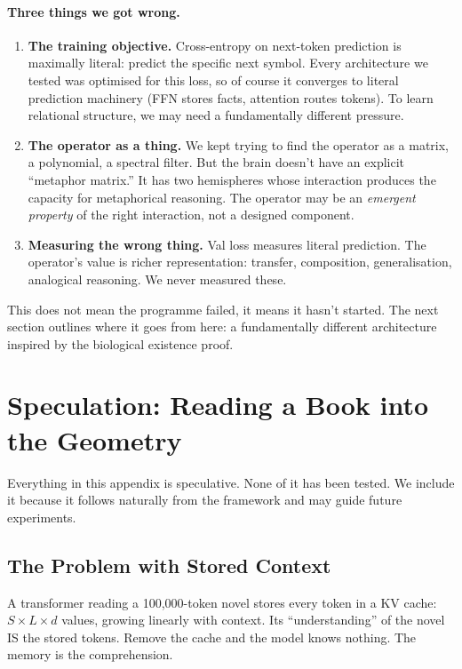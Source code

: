 \documentclass[11pt, a4paper]{article}
\theoremstyle{plain}
\theoremstyle{definition}
\theoremstyle{remark}
\begin{document}
\paragraph{Three things we got wrong.}
\begin{enumerate}[nosep]
\item \textbf{The training objective.} Cross-entropy on next-token prediction is maximally literal: predict the specific next symbol.
Every architecture we tested was optimised for this loss, so of course it converges to literal prediction machinery (FFN stores facts, attention routes tokens).
To learn relational structure, we may need a fundamentally different pressure.

\item \textbf{The operator as a thing.} We kept trying to find the operator as a matrix, a polynomial, a spectral filter.
But the brain doesn't have an explicit ``metaphor matrix.''
It has two hemispheres whose interaction produces the capacity for metaphorical reasoning.
The operator may be an \emph{emergent property} of the right interaction, not a designed component.

\item \textbf{Measuring the wrong thing.} Val loss measures literal prediction.
The operator's value is richer representation: transfer, composition, generalisation, analogical reasoning.
We never measured these.
\end{enumerate}

This does not mean the programme failed, it means it hasn't started.
The next section outlines where it goes from here: a fundamentally different architecture inspired by the biological existence proof.


\section{Speculation: Reading a Book into the Geometry}
\label{sec:infinite-context}

Everything in this appendix is speculative.
None of it has been tested.
We include it because it follows naturally from the framework and may guide future experiments.

\subsection{The Problem with Stored Context}

A transformer reading a 100,000-token novel stores every token in a KV cache: $S \times L \times d$ values, growing linearly with context.
Its ``understanding'' of the novel IS the stored tokens.
Remove the cache and the model knows nothing.
The memory is the comprehension.
\end{document}
